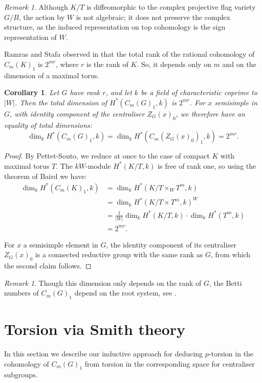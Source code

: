\documentclass[oneside, 12pt, a4paper]{amsart}
\numberwithin{equation}{section}
\theoremstyle{plain}
\newtheorem{corollary}[theorem]{Corollary}
\theoremstyle{definition}
\theoremstyle{remark}
\newtheorem{remark}[theorem]{Remark}
\begin{document}
\begin{remark}
Although $K/T$ is diffeomorphic to the complex projective flag variety $G/B$, the action by $W$ is not algebraic; it does not preserve the complex structure, as the induced representation on top cohomology is the sign representation of $W$.
\end{remark}

Ramras and Stafa observed in \cite[Corollary 5.2]{RamrasStafa} that the total rank of the rational cohomology of $C_m(K)_1$ is $2^{mr}$, where $r$ is the rank of $K$. So, it depends only on $m$ and on the dimension of a maximal torus.



\begin{corollary} \label{cor:constantrank}
Let $G$ have rank $r$, and let $k$ be a field of characteristic coprime to $|W|$. Then the total dimension of  $H^*(C_m(G)_1,k)$ is $2^{mr}$. For $x$ semisimple in $G$, with identity component of the centraliser $Z_G(x)_0$, we therefore have an equality of total dimensions:
\[\dim_k H^*(C_m(G)_1,k)=\dim_k H^*(C_m(Z_G(x)_0)_1,k)=2^{mr}.\]
\end{corollary}

\begin{proof}
By Pettet-Souto, we reduce at once to the case of compact $K$ with maximal torus $T$. The $kW$-module $H^*(K/T,k)$ is free of rank one, so using the theorem of Baird we have: 
\begin{align*}
    \dim_k H^*(C_m(K)_1,k)&=
    \dim_k H^*(K/T\times_W T^m,k)\\&=\dim_k H^*(K/T\times T^m,k)^W\\
    &=\frac{1}{|W|}\dim_k H^*(K/T,k)\cdot \dim_k H^*(T^m,k)\\
    &=2^{mr}.
\end{align*}

For $x$ a semisimple element in $G$, the identity component of its centraliser $Z_G(x)_0$ is a connected reductive group with the same rank as $G$, from which the second claim follows.
\end{proof}

\begin{remark}
Though this dimension only depends on the rank of $G$, the Betti numbers of $C_m(G)_1$ depend on the root system, see \cite[Theorem 1.1]{RamrasStafa}.
\end{remark}

\section{Torsion via Smith theory}
In this section we describe our inductive approach for deducing $p$-torsion in the cohomology of $C_m(G)_1$ from torsion in the corresponding space for centraliser subgroups.
\end{document}
